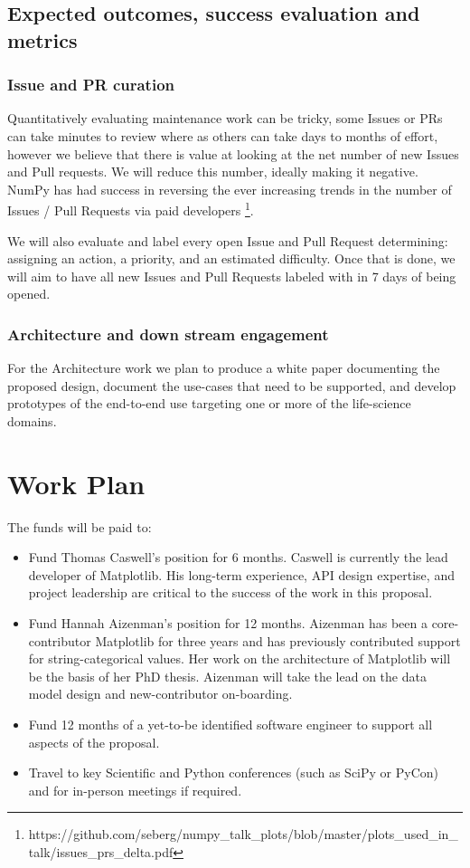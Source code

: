 \documentclass[11pt]{article}  %
\begin{document}
\subsection{Expected outcomes, success evaluation and metrics}
\subsubsection{Issue and PR curation}

Quantitatively evaluating maintenance work can be tricky, some Issues
or PRs can take minutes to review where as others can take days to
months of effort, however we believe that there is value at looking at
the net number of new Issues and Pull requests.  We will reduce this
number, ideally making it negative.  NumPy has had success in
reversing the ever increasing trends in the number of Issues / Pull
Requests via paid
developers \footnote{https://github.com/seberg/numpy\_talk\_plots/blob/master/plots\_used\_in\_talk/issues\_prs\_delta.pdf}.


We will also evaluate and label every open Issue and Pull Request
determining: assigning an action, a priority, and an estimated
difficulty.  Once that is done, we will aim to have all new Issues and
Pull Requests labeled with in 7 days of being opened.


\subsubsection{Architecture and down stream engagement}

For the Architecture work we plan to produce a white paper documenting
the proposed design, document the use-cases that need to be supported,
and develop prototypes of the end-to-end use targeting one or more of the
life-science domains.


\section{Work Plan}

The funds will be paid to:

\begin{itemize}

\item Fund Thomas Caswell's position for 6 months.  Caswell is
  currently the lead developer of Matplotlib.  His long-term
  experience, API design expertise, and project leadership are critical
  to the success of the work in this proposal.
\item Fund Hannah Aizenman's position for 12 months.  Aizenman has
  been a core-contributor Matplotlib for three years and has
  previously contributed support for string-categorical values.  Her
  work on the architecture of Matplotlib will be the basis of her PhD
  thesis.  Aizenman will take the lead on the data model design and
  new-contributor on-boarding.
\item Fund 12 months of a yet-to-be identified software engineer to
  support all aspects of the proposal.
\item Travel to key Scientific and Python conferences (such as SciPy
  or PyCon) and for in-person meetings if required.
\end{itemize}
\end{document}
